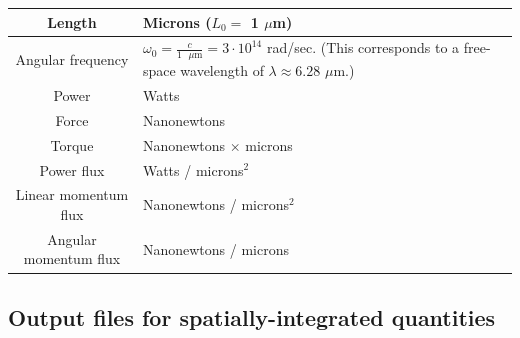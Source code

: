 \documentclass[letterpaper]{article}
\begin{document}
\begin{center}
\renewcommand{\arraystretch}{1.5}
\begin{tabular}{|c|p{}|}\hline
 Length            & Microns ($L_0=$ 1 $\mu$m)
\\\hline
 Angular frequency & $\omega_0=\frac{c}{1\text{ $\mu$m}}
                      =3\cdot 10^{14}$ rad/sec. 
                     (This corresponds to a free-space 
                      wavelength of 
                      $\lambda\approx 6.28$ $\mu$m.)
\\\hline
 Power             & Watts 
\\\hline
 Force             & Nanonewtons
\\\hline
 Torque            & Nanonewtons $\times$ microns
\\\hline
 Power flux        & Watts / microns$^2$
\\\hline
 Linear momentum flux  & Nanonewtons / microns$^2$
\\\hline
 Angular momentum flux & Nanonewtons / microns
\\\hline
\end{tabular}
\end{center}
\renewcommand{\arraystretch}{1.0}

\subsection{Output files for spatially-integrated quantities}
\end{document}
